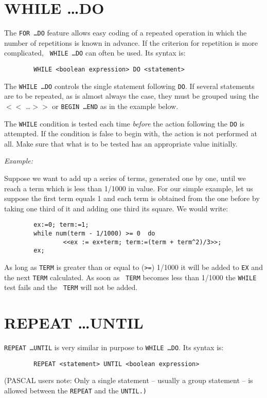 \section{WHILE \ldots DO}

The {\tt FOR \ldots DO} feature allows easy
coding of a repeated operation in which the number of repetitions is known
in advance.  If the criterion for repetition is more complicated, {\tt
WHILE \ldots DO} can often be used.  Its syntax is:
\begin{verbatim}
        WHILE <boolean expression> DO <statement>
\end{verbatim}
The {\tt WHILE \ldots DO} controls the single statement following {\tt DO}.
If several statements are to be repeated, as is almost always the case,
they must be grouped using the $<<$ \ldots $>>$ or {\tt BEGIN \ldots END}
as in the example below.

The {\tt WHILE} condition is tested each time {\em before\/} the action
following the {\tt DO} is attempted.  If the condition is false to begin
with, the action is not performed at all.  Make sure that what is to be
tested has an appropriate value initially.

{\it Example:}

Suppose we want to add up a series of terms, generated one by one, until
we reach a term which is less than 1/1000 in value.  For our simple
example, let us suppose the first term equals 1 and each term is obtained
from the one before by taking one third of it and adding one third its
square. We would write:
\begin{verbatim}
        ex:=0; term:=1;
        while num(term - 1/1000) >= 0  do
                <<ex := ex+term; term:=(term + term^2)/3>>;
        ex;
\end{verbatim}
As long as {\tt TERM} is greater than or equal to ({\tt >=}) 1/1000 it will
be added to {\tt EX} and the next {\tt TERM} calculated.  As soon as {\tt
TERM} becomes less than 1/1000 the {\tt WHILE} test fails and the {\tt
TERM} will not be added.


\section{REPEAT \ldots UNTIL}

 {\tt REPEAT \ldots  UNTIL} is very similar in purpose to
{\tt WHILE \ldots DO}.  Its syntax is:
\begin{verbatim}
        REPEAT <statement> UNTIL <boolean expression>
\end{verbatim}
(PASCAL users note: Only a single statement -- usually a group statement
-- is allowed between the {\tt REPEAT} and the {\tt UNTIL.)}

